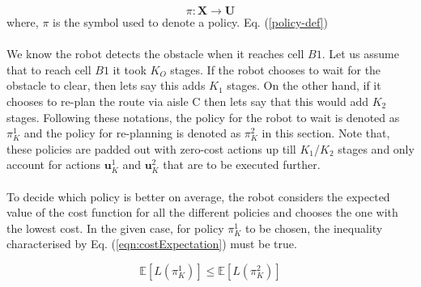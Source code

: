 \documentclass[a4paper,12pt]{article}
\begin{document}
			\begin{equation}
				\pi: \mathbf{X} \rightarrow \mathbf{U}
			\label{policy-def}
			\end{equation}
			where, $\pi$ is the symbol used to denote a policy. Eq. (\ref{policy-def})
			\\
			\\
			We know the robot detects the obstacle when it reaches cell $ B1 $. Let us assume that to reach cell $ B1 $ it took $ K_O $ stages. If the robot chooses to wait for the obstacle to clear, then lets say this adds $ K_1 $ stages. On the other hand, if it chooses to re-plan the route via aisle C then lets say that this would add $K_2$ stages. Following these notations, the policy for the robot to wait is denoted as $\pi_{K}^{1}$ and the policy for re-planning is denoted as $\pi_{K}^{2}$ in this section. Note that, these policies are padded out with zero-cost actions up till $ K_1 $/$ K_2 $ stages and only account for actions $\textbf{u}_{K}^{1}$ and $\textbf{u}_{K}^{2}$ that are to be executed further.
			\\
			\\
			To decide which policy is better on average, the robot considers the expected value of the cost function for all the different policies and chooses the one with the lowest cost. In the given case, for policy $\pi_{K}^{1}$ to be chosen, the inequality characterised by Eq. (\ref{eqn:costExpectation}) must be true.
			
			\begin{equation}
			\mathbb{E}\left[L\left(\pi_{K}^{1}\right)\right] \leq \mathbb{E}\left[L\left(\pi_{K}^{2}\right)\right]
			\label{eqn:costExpectation}
			\end{equation}
			
\end{document}
